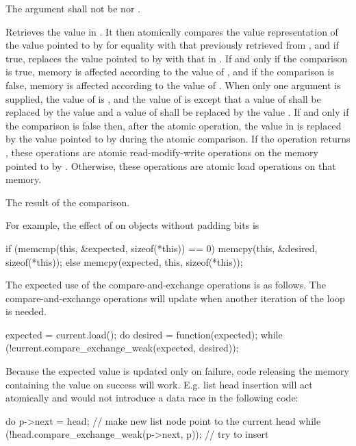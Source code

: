 \begin{itemdescr}
\pnum
\requires The  argument shall not be  nor
.

\pnum
\effects
Retrieves the value in . It then atomically
compares the value representation of the value pointed to by 
for equality with that previously retrieved from ,
and if true, replaces the value pointed to
by  with that in .
If and only if the comparison is true, memory is affected according to the
value of , and if the comparison is false, memory is affected according
to the value of . When only one  argument is
supplied, the value of  is , and the value of
 is  except that a value of 
shall be replaced by the value  and a value of
 shall be replaced by the value
.
If and only if the comparison is false then, after the atomic operation,
the value in  is replaced by the value
pointed to by  during the atomic comparison.
If the operation returns , these
operations are atomic read-modify-write
operations on the memory
pointed to by .
Otherwise, these operations are atomic load operations on that memory.

\pnum
\returns The result of the comparison.

\pnum
\begin{note}
For example, the effect of
on objects without padding bits is
\begin{codeblock}
if (memcmp(this, &expected, sizeof(*this)) == 0)
  memcpy(this, &desired, sizeof(*this));
else
  memcpy(expected, this, sizeof(*this));
\end{codeblock}
\end{note}
\begin{example} The expected use of the compare-and-exchange operations is as follows. The
compare-and-exchange operations will update  when another iteration of
the loop is needed.
\begin{codeblock}
expected = current.load();
do {
  desired = function(expected);
} while (!current.compare_exchange_weak(expected, desired));
\end{codeblock}
\end{example}
\begin{example} Because the expected value is updated only on failure,
code releasing the memory containing the  value on success will work.
E.g. list head insertion will act atomically and would not introduce a
data race in the following code:
\begin{codeblock}
do {
  p->next = head; // make new list node point to the current head
} while (!head.compare_exchange_weak(p->next, p)); // try to insert
\end{codeblock}
\end{example}


\end{itemdescr}
